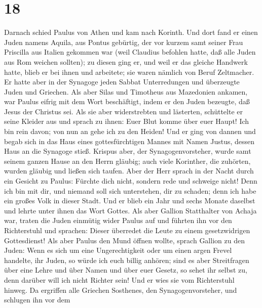 \hypertarget{section-17}{%
\section{18}\label{section-17}}

 Darnach schied Paulus von Athen und kam nach Korinth.
 Und dort fand er einen Juden namens Aquila, aus Pontus
gebürtig, der vor kurzem samt seiner Frau Priscilla aus Italien gekommen
war (weil Claudius befohlen hatte, daß alle Juden aus Rom weichen
sollten);  zu diesen ging er, und weil er das gleiche
Handwerk hatte, blieb er bei ihnen und arbeitete; sie waren nämlich von
Beruf Zeltmacher.  Er hatte aber in der Synagoge jeden
Sabbat Unterredungen und überzeugte Juden und Griechen. 
Als aber Silas und Timotheus aus Mazedonien ankamen, war Paulus eifrig
mit dem Wort beschäftigt, indem er den Juden bezeugte, daß Jesus der
Christus sei.  Als sie aber widerstrebten und lästerten,
schüttelte er seine Kleider aus und sprach zu ihnen: Euer Blut komme
über euer Haupt! Ich bin rein davon; von nun an gehe ich zu den Heiden!
 Und er ging von dannen und begab sich in das Haus eines
gottesfürchtigen Mannes mit Namen Justus, dessen Haus an die Synagoge
stieß.  Krispus aber, der Synagogenvorsteher, wurde samt
seinem ganzen Hause an den Herrn gläubig; auch viele Korinther, die
zuhörten, wurden gläubig und ließen sich taufen.  Aber der
Herr sprach in der Nacht durch ein Gesicht zu Paulus: Fürchte dich
nicht, sondern rede und schweige nicht!  Denn ich bin mit
dir, und niemand soll sich unterstehen, dir zu schaden; denn ich habe
ein großes Volk in dieser Stadt.  Und er blieb ein Jahr
und sechs Monate daselbst und lehrte unter ihnen das Wort Gottes.
 Als aber Gallion Statthalter von Achaja war, traten die
Juden einmütig wider Paulus auf und führten ihn vor den Richterstuhl
 und sprachen: Dieser überredet die Leute zu einem
gesetzwidrigen Gottesdienst!  Als aber Paulus den Mund
öffnen wollte, sprach Gallion zu den Juden: Wenn es sich um eine
Ungerechtigkeit oder um einen argen Frevel handelte, ihr Juden, so würde
ich euch billig anhören;  sind es aber Streitfragen über
eine Lehre und über Namen und über euer Gesetz, so sehet ihr selbst zu,
denn darüber will ich nicht Richter sein!  Und er wies
sie vom Richterstuhl hinweg.  Da ergriffen alle Griechen
Sosthenes, den Synagogenvorsteher, und schlugen ihn vor dem
